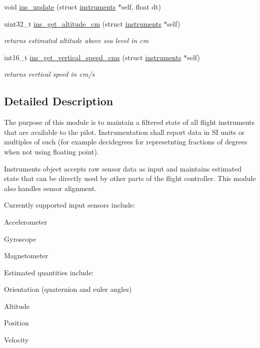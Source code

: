 \begin{DoxyCompactItemize}
\item 
void \hyperlink{group__Instruments__Main_ga126803b1bfe06b359e1f812a6953c521}{ins\+\_\+update} (struct \hyperlink{structinstruments}{instruments} $\ast$self, float dt)
\item 
uint32\+\_\+t \hyperlink{group__Instruments__Main_gab84fcc8b709185d0756575ebe795f4d6}{ins\+\_\+get\+\_\+altitude\+\_\+cm} (struct \hyperlink{structinstruments}{instruments} $\ast$self)
\begin{DoxyCompactList}\small\item\em returns estimated altitude above sea level in cm \end{DoxyCompactList}\item 
int16\+\_\+t \hyperlink{group__Instruments__Main_gaf519442619db57554c4f4a7ea57d007c}{ins\+\_\+get\+\_\+vertical\+\_\+speed\+\_\+cms} (struct \hyperlink{structinstruments}{instruments} $\ast$self)
\begin{DoxyCompactList}\small\item\em returns vertical speed in cm/s \end{DoxyCompactList}\end{DoxyCompactItemize}


\subsection{Detailed Description}
The purpose of this module is to maintain a filtered state of all flight instruments that are available to the pilot. Instrumentation shall report data in S\+I units or multiples of such (for example decidegrees for represetnting fractions of degrees when not using floating point).

Instruments object accepts raw sensor data as input and maintains estimated state that can be directly used by other parts of the flight controller. This module also handles sensor alignment.

Currently supported input sensors include\+:
\begin{DoxyItemize}
\item Accelerometer
\item Gyroscope
\item Magnetometer
\end{DoxyItemize}

Estimated quantities include\+:
\begin{DoxyItemize}
\item Orientation (quaternion and euler angles)
\item Altitude
\item Position
\item Velocity 
\end{DoxyItemize}

